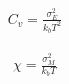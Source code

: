 \begin{appendices}
\begin{align}
  C_v = \frac{\sigma_E^2}{k_b T^2}
\end{align}

\begin{align}
  \chi = \frac{\sigma_M^2}{k_b T}
\end{align}

%
%
%


\end{appendices}
